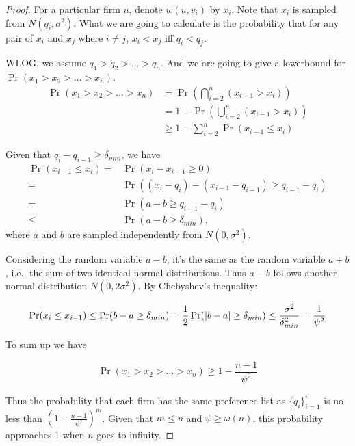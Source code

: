 \begin{proof}
    For a particular firm $u$, %
    denote $w(u, v_i)$ by $x_i$. Note that $x_i$ is sampled from $N(q_i, {\sigma}^2)$.
    What we are going to calculate is the probability that
    for any pair of $x_i$ and $x_j$ where $i \neq j$, $x_i < x_j$ iff $q_i < q_j$.

    WLOG, we assume $q_1 > q_2 > ... > q_n$. And we are going to give a lowerbound
    for $\Pr(x_1 > x_2 > \dots > x_n)$.
    \begin{align*}
        \Pr(x_1 > x_2 > \dots > x_n)
        & = \Pr(\bigcap_{i=2}^{n} (x_{i-1} > x_i)) \\
        & = 1 - \Pr(\bigcup_{i=2}^{n} (x_{i-1} > x_i)) \\
        & \ge 1 - \sum_{i=2}^{n} \Pr(x_{i - 1} \le x_i)
    \end{align*}

    Given that $q_i - q_{i-1} \ge \delta_{min}$,
    we have
    \begin{align*}
    \Pr(x_{i-1} \le x_i) = & \Pr (x_i - x_{i-1} \geq 0) \\
    = & \Pr((x_i - q_i) - (x_{i-1} - q_{i-1}) \geq q_{i-1} - q_i) \\
    = & \Pr(a-b \geq q_{i-1} - q_i) \\
    \leq & \Pr(a-b \geq \delta_{min}),
    \end{align*}
    where $a$ and $b$ are sampled independently from $N(0, \sigma^2)$.

    Considering the random variable $a-b$, it's the same as the random variable $a+b$, i.e.,
    the sum of two identical normal distributions.
    Thus $a-b$ follows another normal distribution $N(0, 2\sigma^2)$.
    By Chebyshev's inequality:

    $$\Pr(x_i \le x_{i - 1}) \le \Pr(b - a \ge \delta_{min})
    = \frac{1}{2} \Pr(\left\vert b-a\right\vert \ge \delta_{min}) \le \frac{\sigma^2}{\delta_{min}^2} = \frac{1}{\psi^2}$$

    To sum up we have

    $$\Pr(x_1 > x_2 > \dots > x_n) \ge 1 - \frac{n - 1}{\psi^2}$$

    Thus the probability that each firm has the same preference list as $\{q_i\}_{i=1}^{n}$
     is no less than $(1 - \frac{n-1}{\psi^2})^m$.
    Given that $m \le n$ and $\psi \ge \omega(n)$, this probability
    approaches 1 when $n$ goes to infinity.
\end{proof}

